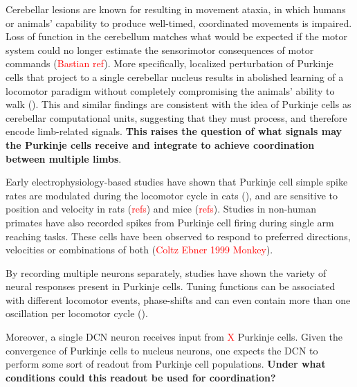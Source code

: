 Cerebellar lesions are known for resulting in movement ataxia, in which humans or animals' capability to produce well-timed, coordinated movements is impaired. Loss of function in the cerebellum matches what would be expected if the motor system could no longer estimate the sensorimotor consequences of motor commands (\textcolor{red}{Bastian ref}). More specifically, localized perturbation of Purkinje cells that project to a single cerebellar nucleus results in abolished learning of a locomotor paradigm without completely compromising the animals' ability to walk (\cite{darmohray_spatial_2019}). This and similar findings  are consistent with the idea of Purkinje cells as cerebellar computational units, suggesting that they must process, and therefore encode limb-related signals. \textbf{This raises the question of what signals may the Purkinje cells receive and integrate to achieve coordination between multiple limbs}.

Early electrophysiology-based studies have shown that Purkinje cell simple spike rates are modulated during the locomotor cycle in cats (\cite{udoSimpleComplexSpike1981, armstrongDischargesPurkinjeCells1984, smithSensorimotorcorrelatedDischargeRecorded1995}), and are sensitive to position and velocity in rats (\textcolor{red}{refs}) and mice (\textcolor{red}{refs}). 
Studies in non-human primates have also recorded spikes from Purkinje cell firing during single arm reaching tasks. These cells have been observed to respond to preferred directions, velocities or combinations of both (\textcolor{red}{Coltz Ebner 1999 Monkey}).

By recording multiple neurons separately, studies have shown the variety of neural responses present in Purkinje cells. Tuning functions can be associated with different locomotor events, phase-shifts and can even contain more than one oscillation per locomotor cycle ().




Moreover, a single DCN neuron receives input from \textcolor{red}{X} Purkinje cells. Given the convergence of Purkinje cells to nucleus neurons, one expects the DCN to perform some sort of readout from Purkinje cell populations. \textbf{Under what conditions could this readout be used for coordination?}

